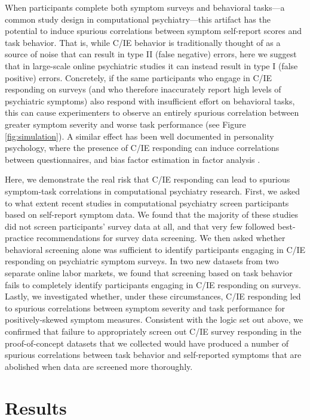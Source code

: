\documentclass[a4paper,notitlepage,12pt]{article}
\begin{document}
When participants complete both symptom surveys and behavioral tasks---a common study design in computational psychiatry---this artifact has the potential to induce spurious correlations between symptom self-report scores and task behavior. That is, while C/IE behavior is traditionally thought of as a source of noise that can result in type II (false negative) errors, here we suggest that in large-scale online psychiatric studies it can instead result in type I (false positive) errors. Concretely, if the same participants who engage in C/IE responding on surveys (and who therefore inaccurately report high levels of psychiatric symptoms) also respond with insufficient effort on behavioral tasks, this can cause experimenters to observe an entirely spurious correlation between greater symptom severity and worse task performance (see Figure \ref{fig:simulation}). A similar effect has been well documented in personality psychology, where the presence of C/IE responding can induce correlations between questionnaires, and bias factor estimation in factor analysis \cite{huang2012detecting, robinson2014inaccurate, huang2015insufficient, chandler2020participant, arias2020little}.

Here, we demonstrate the real risk that C/IE responding can lead to spurious symptom-task correlations in computational psychiatry research. First, we asked to what extent recent studies in computational psychiatry screen participants based on self-report symptom data. We found that the majority of these studies did not screen participants' survey data at all, and that very few followed best-practice recommendations for survey data screening. We then asked whether behavioral screening alone was sufficient to identify participants engaging in C/IE responding on psychiatric symptom surveys. In two new datasets from two separate online labor markets, we found that screening based on task behavior fails to completely identify participants engaging in C/IE responding on surveys. Lastly, we investigated whether, under these circumstances, C/IE responding led to spurious correlations between symptom severity and task performance for positively-skewed symptom measures. Consistent with the logic set out above, we confirmed that failure to appropriately screen out C/IE survey responding in the proof-of-concept datasets that we collected would have produced a number of spurious correlations between task behavior and self-reported symptoms that are abolished when data are screened more thoroughly.

\section*{Results}
\end{document}
